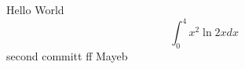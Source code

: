 \documentclass{article}
\begin{document}
Hello World
$$\int_0^4 x^2 \ln{2x}dx$$
second committ  ff
Mayeb
\end{document}
